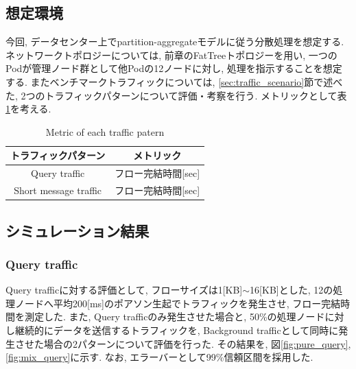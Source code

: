 \documentclass[10pt, a4paper, twocolumn]{jsarticle}
\begin{document}
\subsection{想定環境}
今回, データセンター上でpartition-aggregateモデルに従う分散処理を想定する.
ネットワークトポロジーについては, 前章のFatTreeトポロジーを用い, 一つのPodが管理ノード群として他Podの12ノードに対し,
処理を指示することを想定する.
またベンチマークトラフィックについては, \ref{sec:traffic_scenario}節で述べた, 2つのトラフィックパターンについて評価・考察を行う.
メトリックとして表\ref{metric}を考える.
\begin{table}[h]
\begin{center}
\footnotesize
\begin{tabular}{c|c}
\hline
トラフィックパターン & メトリック \\ \hline \hline
Query traffic & フロー完結時間[sec] \\
Short message traffic & フロー完結時間[sec] \\
\hline
\end{tabular}
\caption{Metric of each traffic patern}
\label{metric}
\end{center}
\end{table}

\subsection{シミュレーション結果}

\subsubsection{Query traffic}
Query trafficに対する評価として, フローサイズは1[KB]$\sim$16[KB]とした,
12の処理ノードへ平均200[ms]のポアソン生起でトラフィックを発生させ, フロー完結時間を測定した.
また, Query trafficのみ発生させた場合と, 50\%の処理ノードに対し継続的にデータを送信するトラフィックを, Background
trafficとして同時に発生させた場合の2パターンについて評価を行った.
その結果を, 図\ref{fig:pure_query}, \ref{fig:mix_query}に示す.
なお, エラーバーとして99\%信頼区間を採用した.
\end{document}
